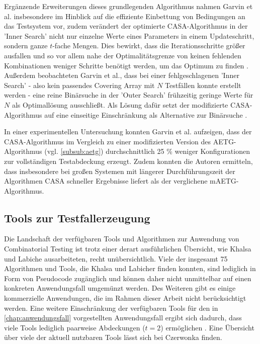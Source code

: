 Ergänzende Erweiterungen dieses grundlegenden Algorithmus nahmen Garvin et al. \cite{garvin2011evaluating} insbesondere im Hinblick auf die effiziente Einbettung von Bedingungen an das Testsystem vor, zudem verändert der optimierte CASA-Algorithmus in der 'Inner Search' nicht nur einzelne Werte eines Parameters in einem Updateschritt, sondern ganze $t$-fache Mengen. Dies bewirkt, dass die Iterationsschritte größer ausfallen und so vor allem nahe der Optimalitätsgrenze von keinen fehlenden Kombinationen weniger Schritte benötigt werden, um das Optimum zu finden \cite{garvin2011evaluating}. Außerdem beobachteten Garvin et al., dass bei einer fehlgeschlagenen 'Inner Search' - also kein passendes Covering Array mit $N$ Testfällen konnte erstellt werden - eine reine Binärsuche in der 'Outer Search' frühzeitig geringe Werte für $N$ als Optimallösung ausschließt. Als Lösung dafür setzt der modifizierte CASA-Algorithmus auf eine einseitige Einschränkung als Alternative zur Binärsuche \cite{garvin2011evaluating}.

In einer experimentellen Untersuchung konnten Garvin et al. \cite{garvin2011evaluating} aufzeigen, dass der CASA-Algorithmus im Vergleich zu einer modifizierten Version des AETG-Algorithmus (vgl. \autoref{subsub:aetg}) durchschnittlich 25 \% weniger Konfigurationen zur vollständigen Testabdeckung erzeugt. Zudem konnten die Autoren ermitteln, dass insbesondere bei großen Systemen mit längerer Durchführungszeit der Algorithmen CASA schneller Ergebnisse liefert als der verglichene mAETG-Algorithmus.

\subsection{Tools zur Testfallerzeugung}

Die Landschaft der verfügbaren Tools und Algorithmen zur Anwendung von Combinatorial Testing ist trotz einer derart ausführlichen Übersicht, wie Khalsa und Labiche \cite{khalsa2014orchestrated} ausarbeiteten, recht unübersichtlich. Viele der insgesamt 75 Algorithmen und Tools, die Khalsa und Labicher finden konnten, sind lediglich in Form von Pseudocode zugänglich und können daher nicht unmittelbar auf einen konkreten Anwendungsfall umgemünzt werden. Des Weiteren gibt es einige kommerzielle Anwendungen, die im Rahmen dieser Arbeit nicht berücksichtigt werden. Eine weitere Einschränkung der verfügbaren Tools für den in \autoref{chap:anwendungsfall} vorgestellten Anwendungsfall ergibt sich dadurch, dass viele Tools lediglich paarweise Abdeckungen ($t=2$) ermöglichen \cite{khalsa2014orchestrated}. Eine Übersicht über viele der aktuell nutzbaren Tools lässt sich bei Czerwonka \cite{pairwisetesting} finden.


